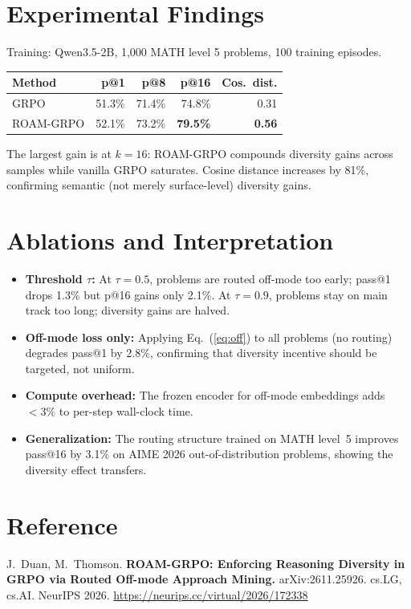 \documentclass[10pt,twocolumn]{article}
\begin{document}
\section{Experimental Findings}

Training: Qwen3.5-2B, 1,000 MATH level 5 problems, 100 training episodes.

\begin{center}
\small
\begin{tabular}{lrrrr}
\toprule
\textbf{Method} & \textbf{p@1} & \textbf{p@8} & \textbf{p@16} & \textbf{Cos.\ dist.} \\
\midrule
GRPO & 51.3\% & 71.4\% & 74.8\% & 0.31 \\
ROAM-GRPO & 52.1\% & 73.2\% & \textbf{79.5\%} & \textbf{0.56} \\
\bottomrule
\end{tabular}
\end{center}

The largest gain is at $k=16$: ROAM-GRPO compounds diversity gains across samples while vanilla GRPO saturates.
Cosine distance increases by 81\%, confirming semantic (not merely surface-level) diversity gains.

\section{Ablations and Interpretation}

\begin{itemize}[leftmargin=1em,itemsep=2pt]
  \item \textbf{Threshold $\tau$:} At $\tau = 0.5$, problems are routed off-mode too early; pass@1 drops 1.3\% but p@16 gains only 2.1\%.
    At $\tau = 0.9$, problems stay on main track too long; diversity gains are halved.
  \item \textbf{Off-mode loss only:} Applying Eq.~(\ref{eq:off}) to all problems (no routing) degrades pass@1 by 2.8\%, confirming that diversity incentive should be targeted, not uniform.
  \item \textbf{Compute overhead:} The frozen encoder for off-mode embeddings adds $<3\%$ to per-step wall-clock time.
  \item \textbf{Generalization:} The routing structure trained on MATH level~5 improves pass@16 by 3.1\% on AIME 2026 out-of-distribution problems, showing the diversity effect transfers.
\end{itemize}

\section*{Reference}
J.\ Duan, M.\ Thomson.
\textbf{ROAM-GRPO: Enforcing Reasoning Diversity in GRPO via Routed Off-mode Approach Mining.}
arXiv:2611.25926. cs.LG, cs.AI. NeurIPS 2026.
\url{https://neurips.cc/virtual/2026/172338}
\end{document}
